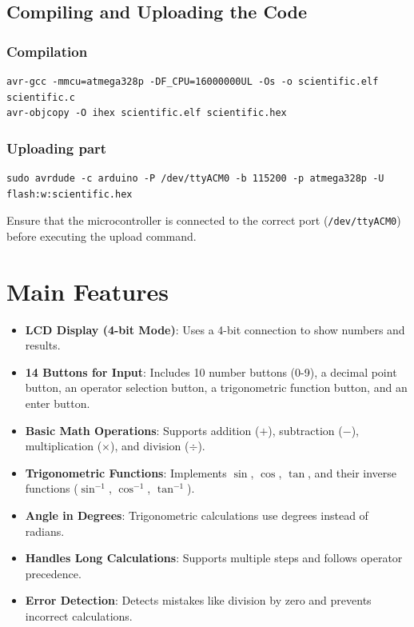 \documentclass[journal]{IEEEtran}
\begin{document}
\subsection{Compiling and Uploading the Code}  
\vspace{0.3cm}  

\vspace{0.3cm}  
\subsubsection{ Compilation}   

\begin{verbatim}
avr-gcc -mmcu=atmega328p -DF_CPU=16000000UL -Os -o scientific.elf scientific.c 
avr-objcopy -O ihex scientific.elf scientific.hex
\end{verbatim}  

\vspace{0.3cm}  
\subsubsection{Uploading part}  
\begin{verbatim}
sudo avrdude -c arduino -P /dev/ttyACM0 -b 115200 -p atmega328p -U flash:w:scientific.hex
\end{verbatim}  

\vspace{0.3cm}  
Ensure that the microcontroller is connected to the correct port (\texttt{/dev/ttyACM0}) before executing the upload command.  
\vspace{0.5cm}  


\section{Main Features}
\begin{itemize}
    \item \textbf{LCD Display (4-bit Mode)}: Uses a 4-bit connection to show numbers and results.
    \item \textbf{14 Buttons for Input}: Includes 10 number buttons (0-9), a decimal point button, an operator selection button, a trigonometric function button, and an enter button.
    \item \textbf{Basic Math Operations}: Supports addition ($+$), subtraction ($-$), multiplication ($\times$), and division ($\div$).
    \item \textbf{Trigonometric Functions}: Implements $\sin$, $\cos$, $\tan$, and their inverse functions ($\sin^{-1}$, $\cos^{-1}$, $\tan^{-1}$).
    \item \textbf{Angle in Degrees}: Trigonometric calculations use degrees instead of radians.
    \item \textbf{Handles Long Calculations}: Supports multiple steps and follows operator precedence.
    \item \textbf{Error Detection}: Detects mistakes like division by zero and prevents incorrect calculations.
\end{itemize}
\end{document}
